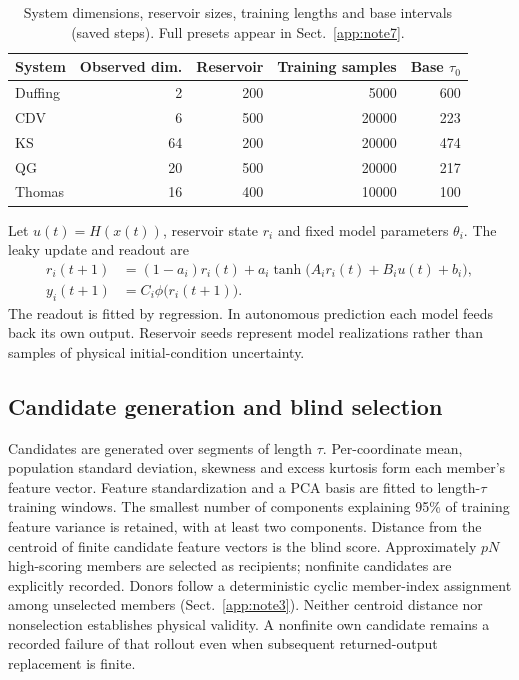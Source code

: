 \documentclass[gmd,manuscript]{copernicus}
\begin{document}
\begin{table}[htbp]
\caption{System dimensions, reservoir sizes, training lengths and base intervals (saved steps). Full presets appear in Sect.~\ref{app:note7}.}\label{tab:scheme-design}
\centering\small\begin{tabular}{lrrrr}\toprule
System & Observed dim. & Reservoir & Training samples & Base $\tau_0$\\\midrule
Duffing & 2 & 200 & 5000 & 600\\
CDV & 6 & 500 & 20000 & 223\\
KS & 64 & 200 & 20000 & 474\\
QG & 20 & 500 & 20000 & 217\\
Thomas & 16 & 400 & 10000 & 100\\
\bottomrule\end{tabular}
\end{table}


Let $u(t)=H(x(t))$, reservoir state $r_i$ and fixed model parameters $\theta_i$. The leaky update and readout are
\begin{align}
r_i(t+1)&=(1-a_i)r_i(t)+a_i\tanh\big(A_i r_i(t)+B_i u(t)+b_i\big),\\
y_i(t+1)&=C_i\phi\big(r_i(t+1)\big).
\end{align}
The readout is fitted by regression. In autonomous prediction each model feeds back its own output. Reservoir seeds represent model realizations rather than samples of physical initial-condition uncertainty.

\subsection{Candidate generation and blind selection}
Candidates are generated over segments of length $\tau$. Per-coordinate mean, population standard deviation, skewness and excess kurtosis form each member's feature vector. Feature standardization and a PCA basis are fitted to length-$\tau$ training windows. The smallest number of components explaining 95\% of training feature variance is retained, with at least two components. Distance from the centroid of finite candidate feature vectors is the blind score. Approximately $pN$ high-scoring members are selected as recipients; nonfinite candidates are explicitly recorded. Donors follow a deterministic cyclic member-index assignment among unselected members (Sect.~\ref{app:note3}). Neither centroid distance nor nonselection establishes physical validity. A nonfinite own candidate remains a recorded failure of that rollout even when subsequent returned-output replacement is finite.
\end{document}
